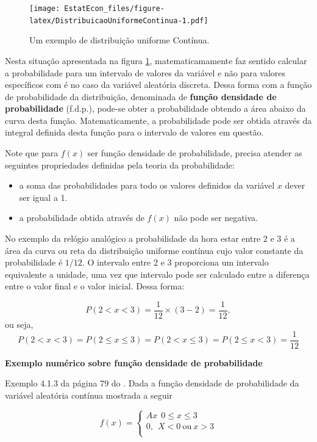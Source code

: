 \documentclass[
]{book}
\providecommand{\tightlist}{%
  \setlength{\itemsep}{0pt}\setlength{\parskip}{0pt}}
\begin{document}
\begin{figure}
\centering
\texttt{[image: EstatEcon\_files/figure-latex/DistribuicaoUniformeContinua-1.pdf]}
\caption{\label{fig:DistribuicaoUniformeContinua}Um exemplo de distribuição uniforme Contínua.}
\end{figure}

Nesta situação apresentada na figura \ref{fig:DistribuicaoUniformeContinua}, matematicamamente faz sentido calcular a probabilidade para um intervalo de valores da variável e não para valores específicos com é no caso da variável aleatória discreta. Dessa forma com a função de probabilidade da distribuição, denominada de \textbf{função densidade de probabilidade} (f.d.p.), pode-se obter a probabilidade obtendo a área abaixo da curva desta função. Matematicamente, a probabilidade pode ser obtida através da integral definida desta função para o intervalo de valores em questão.

Note que para \(f(x)\) ser função densidade de probabilidade, precisa atender as seguintes propriedades definidas pela teoria da probabilidade:

\begin{itemize}
\tightlist
\item
  a soma das probabilidades para todo os valores definidos da variável \(x\) dever ser igual a 1.
\item
  a probabilidade obtida através de \(f(x)\) não pode ser negativa.
\end{itemize}

No exemplo da relógio analógico a probabilidade da hora estar entre 2 e 3 é a área da curva ou reta da distribuição uniforme contínua cujo valor constante da probabilidade é \(1/12\). O intervalo entre 2 e 3 proporciona um intervalo equivalente a unidade, uma vez que intervalo pode ser calculado entre a diferença entre o valor final e o valor inicial. Dessa forma:

\[
P(2 < x < 3) = \dfrac{1}{12} \times \left( 3 - 2 \right) = \dfrac{1}{12},
\]
ou seja,
\[
P(2<x<3) = P(2\leq x \leq 3) = P(2 < x \leq 3) = P(2\leq x < 3) = \dfrac{1}{12}
\]

\textbf{Exemplo numérico sobre função densidade de probabilidade}

Exemplo 4.1.3 da página 79 do \citet{Sartoris2013}. Dada a função densidade de probabilidade da variável aleatória contínua mostrada a seguir

\[
  f(x) = 
    \begin{cases}
      Ax~~0\leq x \leq 3\\
      0,~~X<0~\text{ou}~x>3\\
    \end{cases}
\]
\end{document}
